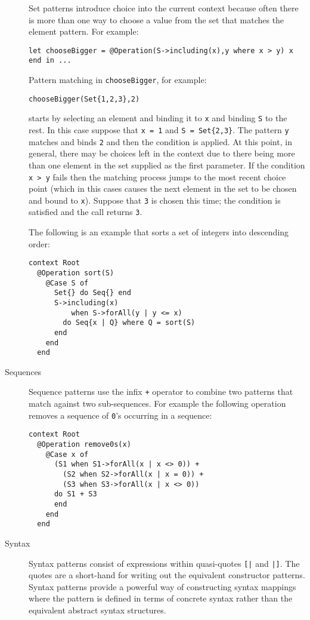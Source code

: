 \documentclass{article}
\begin{document}
\begin{description}
Set patterns introduce choice into the current context because often there is more
than one way to choose a value from the set that matches the element pattern. For 
example:
\begin{verbatim}
let chooseBigger = @Operation(S->including(x),y where x > y) x end in ...
\end{verbatim}
Pattern matching in {\tt chooseBigger}, for example:
\begin{verbatim}
chooseBigger(Set{1,2,3},2)
\end{verbatim}
starts by selecting an element and binding it to {\tt x} and binding {\tt S} 
to the rest. In this case suppose that {\tt x = 1} and {\tt S = Set\{2,3\}}.
The pattern {\tt y} matches and binds {\tt 2} and then the condition is applied. 
At this point, in general, there may be choices left in the context due to there 
being more than one element in the set supplied as the first parameter. If the 
condition {\tt x > y} fails then the matching process jumps to the most recent 
choice point (which in this cases causes the next element in the set to be chosen 
and bound to {\tt x}). Suppose that {\tt 3} is chosen this time; the condition
is satisfied and the call returns {\tt 3}.

The following is an example that sorts a set of integers into descending order:
\begin{verbatim}
context Root
  @Operation sort(S)
    @Case S of
      Set{} do Seq{} end
      S->including(x) 
          when S->forAll(y | y <= x) 
        do Seq{x | Q} where Q = sort(S) 
      end
    end
  end
\end{verbatim}

\item[Sequences]
Sequence patterns use the infix {\tt +} operator to combine two patterns
that match against two sub-sequences. For example the following operation
removes a sequence of {\tt 0}'s occurring in a sequence:
\begin{verbatim}
context Root
  @Operation remove0s(x) 
    @Case x of 
      (S1 when S1->forAll(x | x <> 0)) + 
        (S2 when S2->forAll(x | x = 0)) + 
        (S3 when S3->forAll(x | x <> 0)) 
      do S1 + S3 
      end 
    end
  end
\end{verbatim}

\item[Syntax]
Syntax patterns consist of expressions within quasi-quotes {\tt [|} and {\tt |]}.
The quotes are a short-hand for writing out the equivalent constructor
patterns. Syntax patterns provide a powerful way of constructing syntax
mappings where the pattern is defined in terms of concrete syntax rather
than the equivalent abstract syntax structures.


\end{description}
\end{document}
